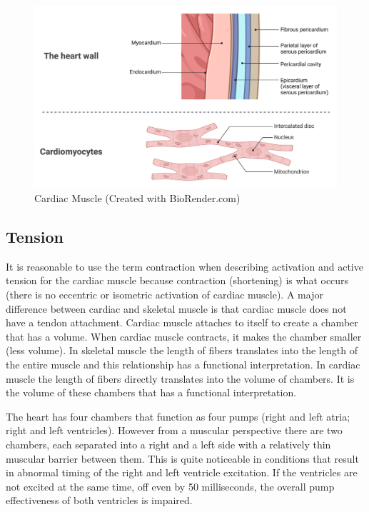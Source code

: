 \begin{figure}[!h]
    \centering
    \includegraphics[width=1\linewidth]{./figure/Cardiac_Muscle.png}
    \caption{Cardiac Muscle \footnotesize{(Created with BioRender.com)}}
    \label{fig:Cardiac_Muscle}
\end{figure}

\subsection{Tension}

It is reasonable to use the term contraction when describing activation and active tension for the cardiac muscle because contraction (shortening) is what occurs (there is no eccentric or isometric activation of cardiac muscle). A major difference between cardiac and skeletal muscle is that cardiac muscle does not have a tendon attachment. Cardiac muscle attaches to itself to create a chamber that has a volume. When cardiac muscle contracts, it makes the chamber smaller (less volume). In skeletal muscle the length of fibers translates into the length of the entire muscle and this relationship has a functional interpretation. In cardiac muscle the length of fibers directly translates into the volume of chambers. It is the volume of these chambers that has a functional interpretation. 

The heart has four chambers that function as four pumps (right and left atria; right and left ventricles). However from a muscular perspective there are two chambers, each separated into a right and a left side with a relatively thin muscular barrier between them. This is quite noticeable in conditions that result in abnormal timing of the right and left ventricle excitation. If the ventricles are not excited at the same time, off even by 50 milliseconds, the overall pump effectiveness of both ventricles is impaired.

